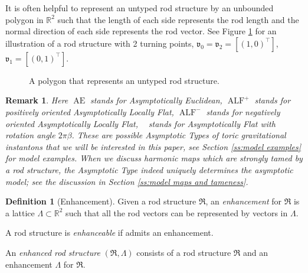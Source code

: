 \documentclass[a4paper,11pt]{amsart}
\newtheorem{remark}[theorem]{Remark}
\theoremstyle{definition}
\newtheorem{definition}[theorem]{Definition}
\numberwithin{equation}{section}
\newcommand{\R}{\mathbb{R}}
\newcommand{\mv} {\mathfrak v}
\newcommand{\mR} {\mathfrak R}
\DeclareMathOperator{\Ae}{AE}
\DeclareMathOperator{\ALF}{ALF}
\DeclareMathOperator{\AFa}{AF_\beta}
\begin{document}
It is often helpful to represent an untyped rod structure by an unbounded polygon in $\R^2$ such that the length of each side represents the rod length and the normal direction of each side represents the rod vector. See Figure \ref{Figure:Example of polygon} for an illustration of a rod structure with 2 turning points, $\mv_0=\mv_2=[(1,0)^\top]$, $\mv_1=[(0, 1)^\top]$. 



\begin{figure}[ht]
	\caption{A polygon that represents an untyped rod structure.}
	 \label{Figure:Example of polygon}   
\end{figure}









  
 \begin{remark}\label{rem:term}
      Here $\Ae$ stands for {Asymptotically Euclidean}, $\ALF^{+}$ stands for  positively oriented {Asymptotically Locally Flat}, $\ALF^{-}$ stands for  negatively oriented {Asymptotically Locally Flat}, $\AFa$ stands for {Asymptotically Flat} with rotation angle $2\pi\beta$. These are possible Asymptotic Types of toric gravitational instantons that we will be interested in this paper, see Section \ref{ss:model examples} for model examples. When we discuss harmonic maps which are strongly tamed by a rod structure, the Asymptotic Type indeed uniquely determines the asymptotic model; see the discussion in Section \ref{ss:model maps and tameness}.
     \end{remark}
  
    
 \begin{definition}[Enhancement]\label{def:enhancement}
 	Given a rod structure \( \mathfrak{R} \), an \emph{enhancement} for \( \mathfrak{R} \) is a lattice \( \Lambda \subset \mathbb{R}^2 \) such that all the rod vectors can be represented by vectors in \( \Lambda \).  

A rod structure is \emph{enhanceable} if admits an enhancement.


	An \emph{enhanced rod structure} $(\mathfrak R, \Lambda)$ consists of a rod structure $\mathfrak R$ and an enhancement $\Lambda$ for $\mR$.
	
	
\end{definition}
\end{document}
